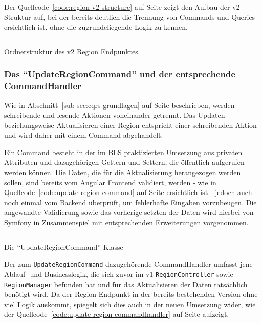 \documentclass[a4paper,12pt,twoside]{scrreprt}
\begin{document}
\medskip

Der Quellcode~\ref{code:region-v2-structure} auf Seite \pageref{code:region-v2-structure} zeigt den Aufbau der v2 Struktur auf, bei der bereits deutlich die Trennung von Commands und Queries ersichtlich ist, ohne die zugrundeliegende Logik zu kennen.

\begin{listing}[ht]
    \inputminted[fontsize=\footnotesize,linenos]{text}{code/region_v2_structure.txt}
    \caption[Ordnerstruktur des v2 Region Endpunktes]{Ordnerstruktur des v2 Region Endpunktes}
    \label{code:region-v2-structure}
\end{listing}

\subsubsection{Das \enquote{UpdateRegionCommand} und der entsprechende CommandHandler}
\label{sub-sub-sec:update-region-command}
Wie in Abschnitt~\ref{sub-sec:cqrs-grundlagen} auf Seite \pageref{sub-sec:cqrs-funktionsweise} beschrieben, werden schreibende und lesende Aktionen voneinander getrennt. Das Updaten beziehungsweise Aktualisieren einer Region entspricht einer schreibenden Aktion und wird daher mit einem Command abgehandelt.

Ein Command besteht in der im BLS praktizierten Umsetzung aus privaten Attributen und dazugehörigen Gettern und Settern, die öffentlich aufgerufen werden können. Die Daten, die für die Aktualisierung herangezogen werden sollen, sind bereits vom Angular Frontend validiert, werden - wie in Quellcode~\ref{code:update-region-command} auf Seite \pageref{code:update-region-command} ersichtlich ist - jedoch auch noch einmal vom Backend überprüft, um fehlerhafte Eingaben vorzubeugen. Die angewandte Validierung sowie das vorherige setzten der Daten wird hierbei von Symfony in Zusammenspiel mit entsprechenden Erweiterungen vorgenommen.

\begin{listing}[ht]
    \inputminted[fontsize=\footnotesize,linenos,breaklines]{php}{code/update_region_command.php}
    \caption[Die \enquote{UpdateRegionCommand} Klasse]{Die \enquote{UpdateRegionCommand} Klasse}
    \label{code:update-region-command}
\end{listing}

Der zum \texttt{UpdateRegionCommand} dazugehörende CommandHandler umfasst jene Ablauf- und Businesslogik, die sich zuvor im v1 \texttt{RegionController} sowie \texttt{RegionManager} befunden hat und für das Aktualisieren der Daten tatsächlich benötigt wird. Da der Region Endpunkt in der bereits bestehenden Version ohne viel Logik auskommt, spiegelt sich dies auch in der neuen Umsetzung wider, wie der Quellcode~\ref{code:update-region-commandhandler} auf Seite \pageref{code:update-region-commandhandler} aufzeigt.
\end{document}

